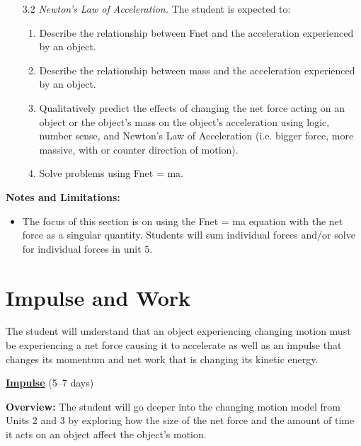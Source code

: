 \documentclass[dvipsnames]{article}
\begin{document}
\begin{enumerate}[topsep=0pt]
    \item[3.2] \textit{Newton's Law of Acceleration.} The student is expected to:
    \begin{enumerate}[topsep=0pt,itemsep=0pt]
        \item Describe the relationship between Fnet and the acceleration experienced by an object.
        \item Describe the relationship between mass and the acceleration experienced by an object.
        \item Qualitatively predict the effects of changing the net force acting on an object or the object's mass on the object's acceleration using logic, number sense, and Newton's Law of Acceleration (i.e. bigger force, more massive, with or counter direction of motion).
        \item Solve problems using Fnet = ma.
    \end{enumerate}
\end{enumerate}

\textbf{Notes and Limitations:}

\begin{itemize}[topsep=-3pt,itemsep=0pt]
    \item The focus of this section is on using the Fnet = ma equation with the net force as a singular quantity. Students will sum individual forces and/or solve for individual forces in unit 5.
\end{itemize}

\section{Impulse and Work}

\vspace{-3pt}
The student will understand that an object experiencing changing motion must be experiencing a net force causing it to accelerate as well as an impulse that changes its momentum and net work that is changing its kinetic energy. 
\vspace{3pt}

\textbf{\underline{Impulse}} (5--7 days)

\textbf{Overview:} The student will go deeper into the changing motion model from Units 2 and 3 by exploring how the size of the net force and the amount of time it acts on an object affect the object's motion.
\end{document}
